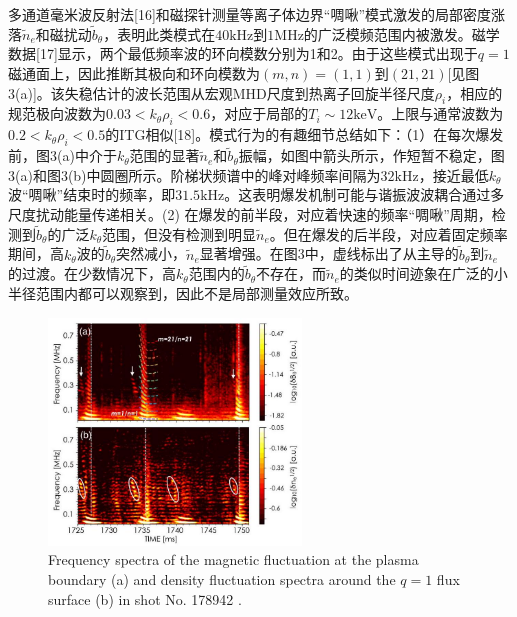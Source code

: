 \documentclass[oneside,onecolumn]{article}
\begin{document}
\begin{sloppypar}
 多通道毫米波反射法[16]和磁探针测量等离子体边界“啁啾”模式激发的局部密度涨落$\tilde{n}_{e}$和磁扰动$\tilde{b}_{\theta}$，表明此类模式在$40\mathrm{kHz}$到$1\mathrm{MHz}$的广泛模频范围内被激发。磁学数据[17]显示，两个最低频率波的环向模数分别为1和2。由于这些模式出现于$q=1$磁通面上，因此推断其极向和环向模数为$(m, n)=(1,1)$到$(21,21)$[见图3(a)]。该失稳估计的波长范围从宏观MHD尺度到热离子回旋半径尺度$\rho_{i}$，相应的规范极向波数为$0.03<k_{\theta}\rho_{i}<0.6$，对应于局部的$T_{i}\sim12\mathrm{keV}$。上限与通常波数为$0.2<k_{\theta}\rho_{i}<0.5$的ITG相似[18]。模式行为的有趣细节总结如下：（1）在每次爆发前，图3(a)中介于$k_{\theta}$范围的显著$\tilde{n}_{e}$和$\tilde{b}_{\theta}$振幅，如图中箭头所示，作短暂不稳定，图3(a)和图3(b)中圆圈所示。阶梯状频谱中的峰对峰频率间隔为$32\mathrm{kHz}$，接近最低$k_{\theta}$波“啁啾”结束时的频率，即$31.5\mathrm{kHz}$。这表明爆发机制可能与谐振波波耦合通过多尺度扰动能量传递相关。(2) 在爆发的前半段，对应着快速的频率“啁啾”周期，检测到$\tilde{b}_{\theta}$的广泛$k_{\theta}$范围，但没有检测到明显$\tilde{n}_{e}$。但在爆发的后半段，对应着固定频率期间，高$k_{\theta}$波的$\tilde{b}_{\theta}$突然减小，$\tilde{n}_{e}$显著增强。在图3中，虚线标出了从主导的$\tilde{b}_{\theta}$到$\tilde{n}_{e}$的过渡。在少数情况下，高$k_{\theta}$范围内的$\tilde{b}_{\theta}$不存在，而$\tilde{n}_{e}$的类似时间迹象在广泛的小半径范围内都可以观察到，因此不是局部测量效应所致。
  \begin{figure}[htbp]
  	\centering
  	\includegraphics[max width=0.6\textwidth,max height=1.0\textheight]{2023_06_19_f8dbb752866ca158c73eg-3(1)}
  	\caption{Frequency spectra of the magnetic fluctuation at the plasma boundary (a) and density fluctuation spectra around the $q=1$ flux surface (b) in shot No. 178942 .}
  	\label{figure3}
  \end{figure}
  

\end{sloppypar}
\end{document}
